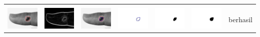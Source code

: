 \begin{table}[H]
\begin{tabular}{|m{0.7in}|m{0.7in}|m{0.7in}|m{0.7in}|m{0.7in}|m{0.7in}|m{0.7in}|}
		&  &  & & & &  \\
		\includegraphics[width=0.7in]{dataset/dataset_3/luka_merah/ready/44_interp_init.jpg}&
		\includegraphics[width=0.7in]{dataset/dataset_3/luka_merah/ready/44_interp_ext.jpg}&
		\includegraphics[width=0.7in]{dataset/dataset_3/luka_merah/ready/44_interp_result.jpg}&
		\includegraphics[width=0.7in]{dataset/dataset_3/luka_merah/ready/44_gt_r.jpg}&
		\includegraphics[width=0.7in]{dataset/dataset_3/luka_merah/ready/44_r.jpg}&
		\includegraphics[width=0.7in]{dataset/dataset_3/luka_merah/ready/44_interp_r.jpg}&
		berhasil\\
		\hline
		

\end{tabular}
\end{table}
